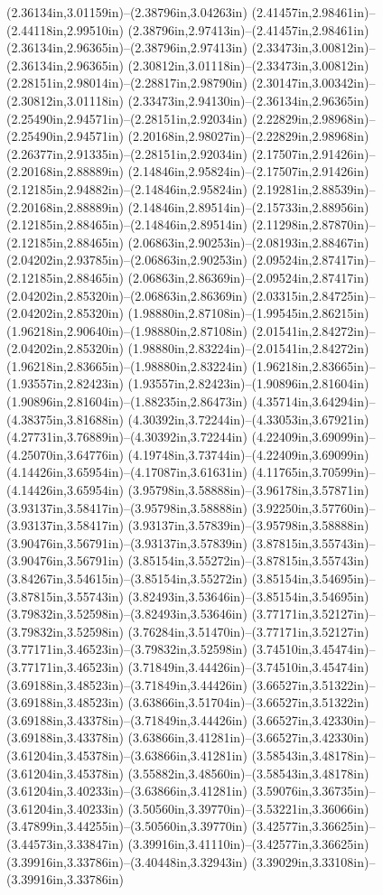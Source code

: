 (2.36134in,3.01159in)--(2.38796in,3.04263in) (2.41457in,2.98461in)--(2.44118in,2.99510in) (2.38796in,2.97413in)--(2.41457in,2.98461in) (2.36134in,2.96365in)--(2.38796in,2.97413in) (2.33473in,3.00812in)--(2.36134in,2.96365in) (2.30812in,3.01118in)--(2.33473in,3.00812in) (2.28151in,2.98014in)--(2.28817in,2.98790in) (2.30147in,3.00342in)--(2.30812in,3.01118in) (2.33473in,2.94130in)--(2.36134in,2.96365in) (2.25490in,2.94571in)--(2.28151in,2.92034in) (2.22829in,2.98968in)--(2.25490in,2.94571in) (2.20168in,2.98027in)--(2.22829in,2.98968in) (2.26377in,2.91335in)--(2.28151in,2.92034in) (2.17507in,2.91426in)--(2.20168in,2.88889in) (2.14846in,2.95824in)--(2.17507in,2.91426in) (2.12185in,2.94882in)--(2.14846in,2.95824in) (2.19281in,2.88539in)--(2.20168in,2.88889in) (2.14846in,2.89514in)--(2.15733in,2.88956in) (2.12185in,2.88465in)--(2.14846in,2.89514in) (2.11298in,2.87870in)--(2.12185in,2.88465in) (2.06863in,2.90253in)--(2.08193in,2.88467in) (2.04202in,2.93785in)--(2.06863in,2.90253in) (2.09524in,2.87417in)--(2.12185in,2.88465in) (2.06863in,2.86369in)--(2.09524in,2.87417in) (2.04202in,2.85320in)--(2.06863in,2.86369in) (2.03315in,2.84725in)--(2.04202in,2.85320in) (1.98880in,2.87108in)--(1.99545in,2.86215in) (1.96218in,2.90640in)--(1.98880in,2.87108in) (2.01541in,2.84272in)--(2.04202in,2.85320in) (1.98880in,2.83224in)--(2.01541in,2.84272in) (1.96218in,2.83665in)--(1.98880in,2.83224in) (1.96218in,2.83665in)--(1.93557in,2.82423in) (1.93557in,2.82423in)--(1.90896in,2.81604in) (1.90896in,2.81604in)--(1.88235in,2.86473in) (4.35714in,3.64294in)--(4.38375in,3.81688in) (4.30392in,3.72244in)--(4.33053in,3.67921in) (4.27731in,3.76889in)--(4.30392in,3.72244in) (4.22409in,3.69099in)--(4.25070in,3.64776in) (4.19748in,3.73744in)--(4.22409in,3.69099in) (4.14426in,3.65954in)--(4.17087in,3.61631in) (4.11765in,3.70599in)--(4.14426in,3.65954in) (3.95798in,3.58888in)--(3.96178in,3.57871in) (3.93137in,3.58417in)--(3.95798in,3.58888in) (3.92250in,3.57760in)--(3.93137in,3.58417in) (3.93137in,3.57839in)--(3.95798in,3.58888in) (3.90476in,3.56791in)--(3.93137in,3.57839in) (3.87815in,3.55743in)--(3.90476in,3.56791in) (3.85154in,3.55272in)--(3.87815in,3.55743in) (3.84267in,3.54615in)--(3.85154in,3.55272in) (3.85154in,3.54695in)--(3.87815in,3.55743in) (3.82493in,3.53646in)--(3.85154in,3.54695in) (3.79832in,3.52598in)--(3.82493in,3.53646in) (3.77171in,3.52127in)--(3.79832in,3.52598in) (3.76284in,3.51470in)--(3.77171in,3.52127in) (3.77171in,3.46523in)--(3.79832in,3.52598in) (3.74510in,3.45474in)--(3.77171in,3.46523in) (3.71849in,3.44426in)--(3.74510in,3.45474in) (3.69188in,3.48523in)--(3.71849in,3.44426in) (3.66527in,3.51322in)--(3.69188in,3.48523in) (3.63866in,3.51704in)--(3.66527in,3.51322in) (3.69188in,3.43378in)--(3.71849in,3.44426in) (3.66527in,3.42330in)--(3.69188in,3.43378in) (3.63866in,3.41281in)--(3.66527in,3.42330in) (3.61204in,3.45378in)--(3.63866in,3.41281in) (3.58543in,3.48178in)--(3.61204in,3.45378in) (3.55882in,3.48560in)--(3.58543in,3.48178in) (3.61204in,3.40233in)--(3.63866in,3.41281in) (3.59076in,3.36735in)--(3.61204in,3.40233in) (3.50560in,3.39770in)--(3.53221in,3.36066in) (3.47899in,3.44255in)--(3.50560in,3.39770in) (3.42577in,3.36625in)--(3.44573in,3.33847in) (3.39916in,3.41110in)--(3.42577in,3.36625in) (3.39916in,3.33786in)--(3.40448in,3.32943in) (3.39029in,3.33108in)--(3.39916in,3.33786in) 
